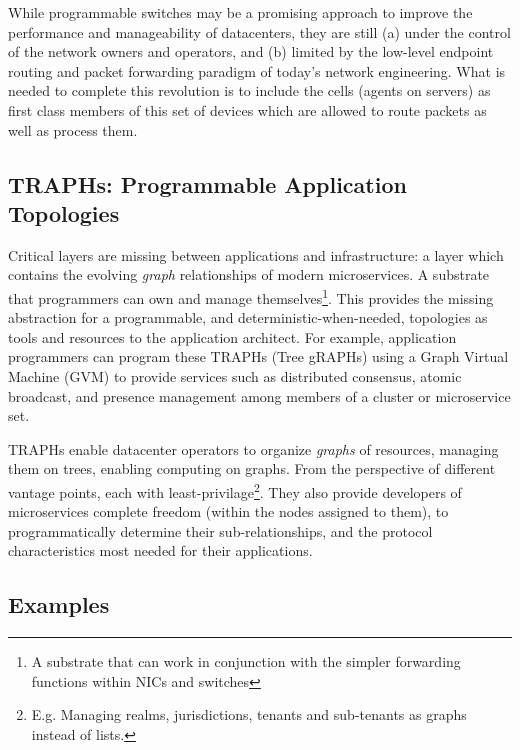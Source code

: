 While programmable switches may be a promising approach to improve the performance and manageability of datacenters, they are still (a)  under the control of the network owners and operators, and (b) limited by the low-level endpoint routing and packet forwarding paradigm of today's network engineering. What is needed to complete this revolution is to include the cells (agents on servers) as first class members of this set of devices which are allowed to route packets as well as process them.


\subsection*{TRAPHs: Programmable Application Topologies}
 
Critical layers are missing between applications and infrastructure: a layer which contains the evolving \emph{graph} relationships of modern microservices. A substrate that  programmers can own and manage themselves\footnote{A substrate that can work in conjunction with the simpler forwarding functions within NICs and switches}.
This provides the missing abstraction for a programmable, and deterministic-when-needed, topologies as tools and resources to the application architect. For example, application programmers can program these TRAPHs (Tree gRAPHs) using a Graph Virtual Machine (GVM) to provide services such as distributed consensus, atomic broadcast, and presence management among members of a cluster or microservice set. %

TRAPHs enable datacenter operators to organize \emph{graphs} of resources, managing them on trees, enabling computing on graphs. From the perspective of different vantage points, each with least-privilage\footnote{E.g. Managing realms, jurisdictions, tenants and sub-tenants as graphs instead of lists.}. They also provide developers of microservices complete freedom (within the nodes assigned to them), to programmatically determine their sub-relationships, and the protocol characteristics most needed for their applications.


\subsection*{Examples}

